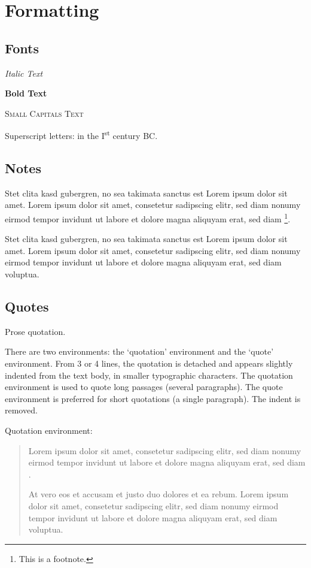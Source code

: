 \chapter{Formatting}

\section{Fonts}

\textit{Italic Text}

\textbf{Bold Text}

\textsc{Small Capitals Text}

Superscript letters: in the I\textsuperscript{st} century BC.


\section{Notes}

Stet clita kasd gubergren, no sea takimata sanctus est Lorem ipsum dolor sit amet. Lorem ipsum dolor sit amet, consetetur sadipscing elitr, sed diam nonumy eirmod tempor invidunt ut labore et dolore magna aliquyam erat, sed diam \footnote{This is a footnote.}.

Stet clita kasd gubergren, no sea takimata sanctus est Lorem ipsum dolor sit amet. Lorem ipsum dolor sit amet, consetetur sadipscing elitr, sed diam nonumy eirmod tempor invidunt ut labore et dolore magna aliquyam erat, sed diam voluptua.


\section{Quotes}

Prose quotation.

There are two environments: the `quotation' environment and the `quote' environment. From 3 or 4 lines, the quotation is detached and appears slightly indented from the text body, in smaller typographic characters. The quotation environment is used to quote long passages (several paragraphs). The quote environment is preferred for short quotations (a single paragraph). The indent is removed.

Quotation environment:

\small
\begin{quotation}
Lorem ipsum dolor sit amet, consetetur sadipscing elitr, sed diam nonumy eirmod tempor invidunt ut labore et dolore magna aliquyam erat, sed diam . 

At vero eos et accusam et justo duo dolores et ea rebum. Lorem ipsum dolor sit amet, consetetur sadipscing elitr, sed diam nonumy eirmod tempor invidunt ut labore et dolore magna aliquyam erat, sed diam voluptua.
\end{quotation}

